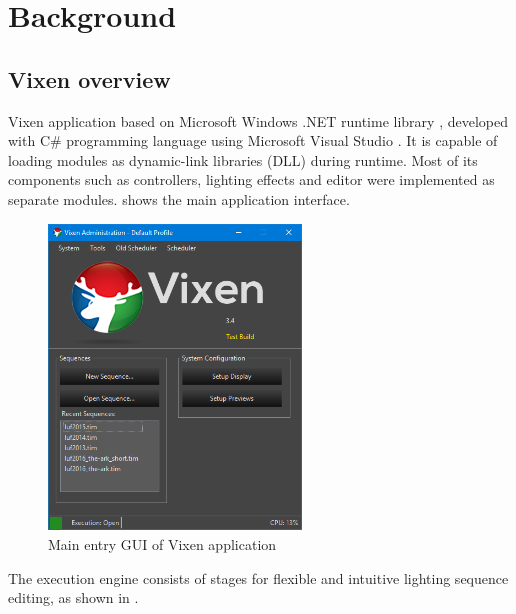 \chapter{Background}
\renewcommand{\baselinestretch}{\mystretch}
\label{chap:BG}

\section{Vixen overview}

 Vixen application  based on  Microsoft Windows .NET runtime library \cite{platt2002introducing}, developed with  C\# programming language \cite{hejlsberg2003c} using Microsoft Visual Studio \cite{msvs}. It is capable of loading modules as dynamic-link libraries (DLL) during runtime. Most of its components such as controllers, lighting effects and editor were implemented as separate modules.  shows the main application interface.

\begin{figure}[!t]
  \centering
  \includegraphics[width=0.6\textwidth]{Figs//vixen_main.png}
  \caption{\footnotesize Main entry GUI of Vixen application}
  \label{fig:vixen-main}
\end{figure}

The execution engine consists of  stages for flexible and intuitive lighting sequence editing, as shown in .

